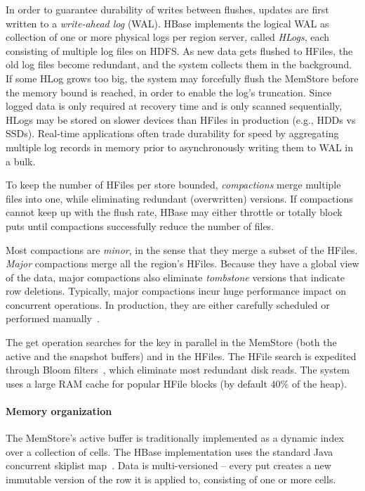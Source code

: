 In order to guarantee durability of writes between flushes, updates are first written to 
a \emph{write-ahead log} (WAL). HBase implements the logical WAL as collection of one or more physical 
logs per region server, called \emph{HLogs}, each consisting of multiple log files on HDFS. 
As new data gets flushed to HFiles, the old log files become redundant, and the system collects 
them in the background. 
If some HLog grows too big, the system may forcefully
flush the MemStore before the memory bound is reached, in order to enable the log's truncation. 
Since logged data is only required at recovery time and is only scanned sequentially, HLogs
may be stored on slower devices than HFiles in production (e.g., HDDs vs SSDs). 
Real-time applications often trade durability for speed by aggregating multiple log records 
in memory prior to asynchronously writing them to WAL in a bulk. 

To keep the number of HFiles per store bounded, \emph{compactions} merge multiple files 
into one, while eliminating redundant (overwritten) versions. If compactions cannot keep up
with the flush rate, HBase may either throttle or totally block  puts until  compactions 
successfully reduce the number of files. 

Most compactions are \emph{minor}, 
in the sense that they merge a subset of the HFiles. \emph{Major} compactions merge all the region's 
HFiles. Because they have a global view of the data, major compactions also eliminate 
{\em tombstone} versions that indicate row deletions. Typically, major compactions incur huge 
performance impact on concurrent operations. In production, they are either carefully scheduled 
or performed manually~\cite{hbasetuning}.

The get operation searches for the key in parallel in the MemStore (both the active and the 
snapshot buffers) and in the HFiles. The HFile search  is expedited through Bloom 
filters~\cite{Chang2008}, which eliminate most redundant disk reads. The system 
uses a large RAM cache for popular HFile blocks (by default $40\%$ of the heap).

\paragraph{Memory organization}
The MemStore's active buffer is traditionally implemented as a dynamic index over a collection of cells.  
The HBase implementation uses the standard Java concurrent skiplist map~\cite{javaskiplist}.
Data is multi-versioned -- every put creates a new immutable version of the row it is applied to, 
consisting of one or more cells. 

